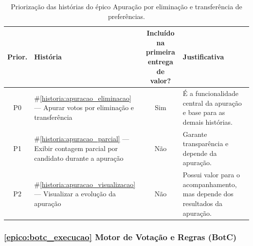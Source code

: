 \documentclass[12pt,a4paper]{article}
\newcounter{epico}
\newcounter{historia}
\begin{document}
\begin{table}[H]
\centering
\small
\begin{tabular}{|c|m{3.4cm}|c|m{6.7cm}|}
\hline
\rowcolor[gray]{0.9}
\textbf{Prior.} &
\textbf{História} &
\makecell{\textbf{Incluído na primeira}\\
\textbf{entrega de valor?}} &
\textbf{Justificativa} \\
\hline

P0 &
\#\ref{historia:apuracao_eliminacao} --- Apurar votos por eliminação e transferência &
Sim &
É a funcionalidade central da apuração e base para as demais histórias. \\

\hline
P1 &
\#\ref{historia:apuracao_parcial} --- Exibir contagem parcial por candidato durante a apuração &
Não &
Garante transparência e depende da apuração. \\

\hline
P2 &
\#\ref{historia:apuracao_visualizacao} --- Visualizar a evolução da apuração &
Não &
Possui valor para o acompanhamento, mas depende dos resultados da apuração. \\

\hline
\end{tabular}
\caption{Priorização das histórias do épico Apuração por eliminação e transferência de preferências.}
\end{table}

\subsubsection{\ref{epico:botc_execucao} Motor de Votação e Regras (BotC)}
\end{document}
